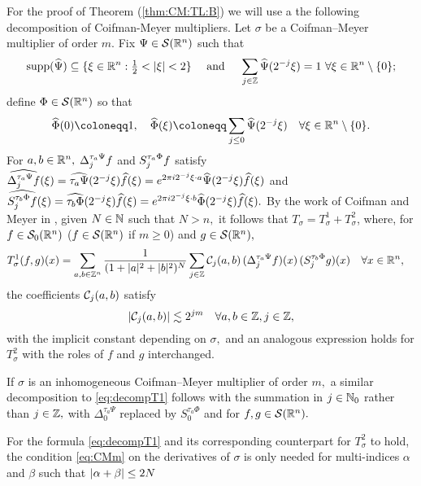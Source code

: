 For the proof of Theorem (\ref{thm:CM:TL:B}) we will use a the following decomposition of Coifman-Meyer multipliers. Let $\sigma$ be a Coifman--Meyer multiplier of order $m.$
Fix $\Psi \in {\mathcal{S}}({{\mathbb R}^n})$ such that 
$$
{\rm{supp}}(\widehat{\Psi}) \subseteq \{ \xi \in {{\mathbb R}^n} : {\textstyle \frac{1}{2}} < |\xi| < 2 \} \quad\text{ and }\quad
\sum_{j\in\mathbb{Z}} \widehat{\Psi}(2^{-j}\xi) = 1 \,\,\forall \xi \in {{\mathbb R}^n} \setminus \{ 0 \};
$$
define $\Phi \in {\mathcal{S}}({{\mathbb R}^n})$ so that
$$
\widehat{\Phi}(0) \coloneqq 1,\quad \widehat{\Phi}(\xi) \coloneqq \sum_{j \le 0} \widehat{\Psi}(2^{-j}\xi)\quad \forall \xi\in\rn\setminus \{0\}.$$
For $a,b\in{{\mathbb R}^n},$ $\Delta^{\tau_a \Psi }_{j} f$ and  $S^{ \tau_a \Phi }_{j} f$ satisfy $\widehat{\Delta^{\tau_a \Psi }_{j} f}(\xi)=\widehat{\tau_a\Psi}(2^{-j}\xi)\widehat{f}(\xi)=e^{2\pi i 2^{-j}\xi\cdot a} \widehat{\Psi}(2^{-j}\xi)\widehat{f}(\xi)$ and   $\widehat{S^{\tau_b \Phi }_{j} f}(\xi)=\widehat{\tau_b\Phi}(2^{-j}\xi)\widehat{f}(\xi)=e^{2\pi i 2^{-j}\xi\cdot b} \widehat{\Phi}(2^{-j}\xi)\widehat{f}(\xi).$ 
By the work of Coifman and Meyer in \cite{MR518170},  given $N\in \mathbb{N}$ such that $N>n,$ it follows that $T_\sigma= T_\sigma^1 + T_\sigma^2$, where, for  $f\in {\mathcal{S}_0}({{\mathbb R}^n})$ ($f\in {\mathcal{S}}({{\mathbb R}^n})$ if $m\ge 0$) and $g\in{\mathcal{S}}({{\mathbb R}^n}),$
\begin{align}\label{eq:decompT1}
T_\sigma^1(f,g)(x) &= \sum_{a,b\in \mathbb{Z}^n} \frac{1}{(1+|a|^2+|b|^2)^N} \sum_{j\in\mathbb{Z}} \mathcal{C}_j(a,b) \,(\Delta^{ \tau_a \Psi }_{j} f)(x)\, (S^{ \tau_b \Phi }_{j} g )(x)\quad \forall x\in {{\mathbb R}^n},
\end{align}
 the coefficients $\mathcal{C}_j(a,b)$   satisfy
\begin{equation}\label{eq:cjbound}
\left\vert \mathcal{C}_j(a,b) \right\vert\lesssim 2^{jm}\quad \forall a,b\in\mathbb{Z}, j\in \mathbb{Z},
\end{equation}
with the implicit constant depending on $\sigma,$ and an analogous expression holds for $T_\sigma^2$ with the roles of $f$ and $g$ interchanged. 

If $\sigma$ is an inhomogeneous Coifman--Meyer multiplier of order $m,$ a similar decomposition to \eqref{eq:decompT1} follows  with the summation in $j\in\mathbb{N}_0$ rather than $j\in\mathbb{Z},$  with  $\Delta_0^{\tau_a \Psi}$ replaced by $S_0^{\tau_a\Phi}$ and for $f,g\in {\mathcal{S}}({{\mathbb R}^n}).$

\begin{remark}\label{re:numderiv1} For the formula \eqref{eq:decompT1}  and its corresponding counterpart for $T^2_\sigma$ to hold, the condition \eqref{eq:CMm} on the derivatives of $\sigma$ is only needed for multi-indices $\alpha$ and $\beta$ such that  $\left\vert \alpha+\beta \right\vert\le 2N$
\end{remark}

